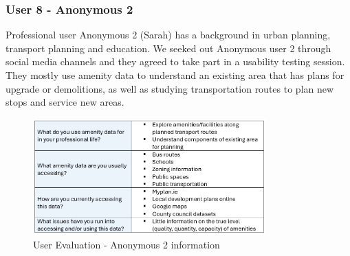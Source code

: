 \newpage
\subsubsection{User 8 - Anonymous 2}
Professional user Anonymous 2 (Sarah) has a background in urban planning, transport planning and education. We seeked out Anonymous user 2 through social media channels and they agreed to take part in a usability testing session.\\
They mostly use amenity data to understand an existing area that has plans for upgrade or demolitions, as well as studying transportation routes to plan new stops and service new areas.\\
\begin{figure}[h!]
    \centering
    \includegraphics[width=0.8\textwidth]{images/sarah-amenity-info.png}
    \caption{User Evaluation - Anonymous 2 information}
\end{figure}

